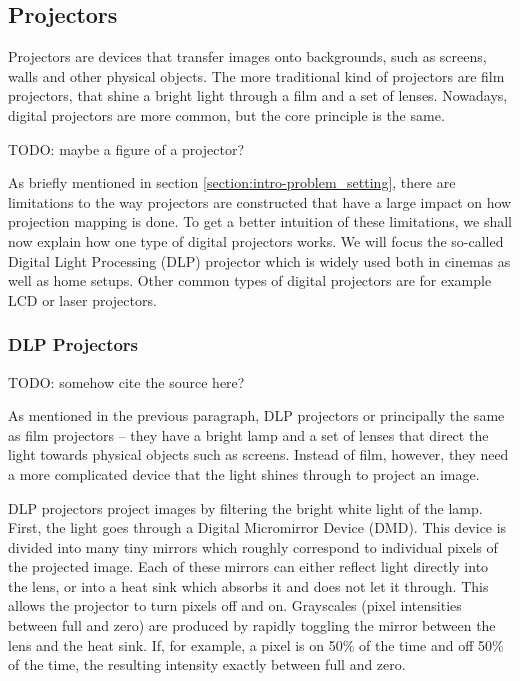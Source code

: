 \subsection{Projectors}
\label{section:background-projection_mapping-projectors}

Projectors are devices that transfer images onto backgrounds, such as screens, walls and other physical objects. The more traditional kind of projectors are film projectors, that shine a bright light through a film and a set of lenses. Nowadays, digital projectors are more common, but the core principle is the same.

{\color{red} TODO: maybe a figure of a projector?}

As briefly mentioned in section \ref{section:intro-problem_setting}, there are limitations to the way projectors are constructed that have a large impact on how projection mapping is done. To get a better intuition of these limitations, we shall now explain how one type of digital projectors works. We will focus the so-called Digital Light Processing (DLP) projector which is widely used both in cinemas as well as home setups. Other common types of digital projectors are for example LCD or laser projectors.

\subsubsection{DLP Projectors}
\label{section:background-projection_mapping-projectors-DLP}

{\color{red} TODO: somehow cite the source here?}

As mentioned in the previous paragraph, DLP projectors or principally the same as film projectors -- they have a bright lamp and a set of lenses that direct the light towards physical objects such as screens. Instead of film, however, they need a more complicated device that the light shines through to project an image.

DLP projectors project images by filtering the bright white light of the lamp. First, the light goes through a Digital Micromirror Device (DMD). This device is divided into many tiny mirrors which roughly correspond to individual pixels of the projected image. Each of these mirrors can either reflect light directly into the lens, or into a heat sink which absorbs it and does not let it through. This allows the projector to turn pixels off and on. Grayscales (pixel intensities between full and zero) are produced by rapidly toggling the mirror between the lens and the heat sink. If, for example, a pixel is on 50\% of the time and off 50\% of the time, the resulting intensity exactly between full and zero.

